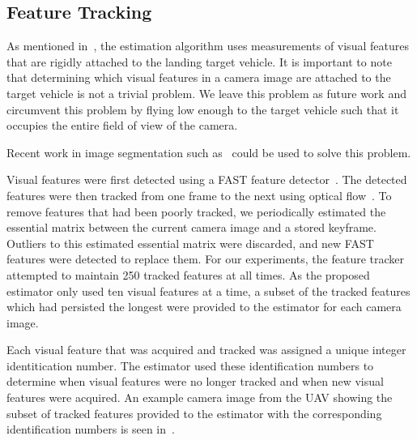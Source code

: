 
\subsection{Feature Tracking}
As mentioned in~,
the estimation algorithm uses measurements of visual features that are
rigidly attached to the landing target vehicle. It is important to note that
determining which visual features in a camera image are attached to
the target vehicle is not a trivial problem. We leave this problem as future work and
circumvent this problem by flying low enough to the target vehicle such that it
occupies the entire field of view of the camera.

Recent work in image segmentation such as~\cite{jia2019sequential} could be used
to solve this problem.

Visual features were first detected using a FAST feature
detector~\cite{rosten2006machine}. The detected features were then tracked from one frame to
the next using optical flow~\cite{bouguet2001pyramidal}.
To remove features that had been poorly tracked, we periodically
estimated the essential matrix between the current camera image
and a stored keyframe.
Outliers to this estimated essential matrix were discarded, and new FAST
features were detected to replace them.
For our experiments, the feature tracker attempted to maintain 250
tracked features at all times. As the proposed estimator only used ten visual
features at a time,
a subset of the tracked features which had persisted the longest
were provided to the estimator for each camera image.

Each visual feature that was acquired and tracked was assigned a unique integer
identitication number. The estimator used these identification numbers to
determine when visual features were no longer tracked and when new visual
features were acquired.
An example camera image from the UAV showing the
subset of tracked features provided to the estimator with the corresponding
identification
numbers is seen in~.


